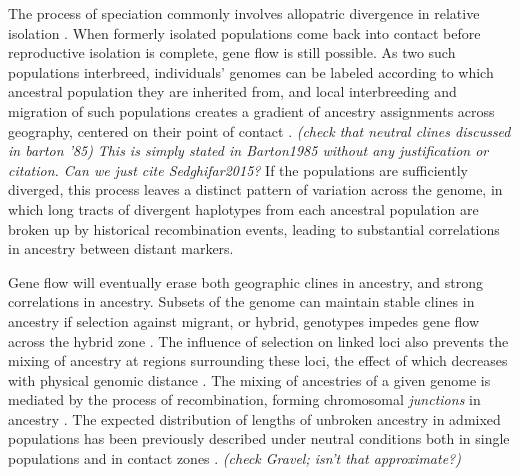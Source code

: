\documentclass[11pt,letterpaper]{article}
\newcommand{\alisa}[1]{{\em \color{red} #1}}
\newcommand{\plr}[1]{{\em \color{blue} #1}}
\begin{document}

The process of speciation commonly involves allopatric divergence in relative isolation \citep{Coyne2004}.  
When formerly isolated populations come back into contact 
before reproductive isolation is complete, gene flow is still possible. 
As two such populations interbreed,
individuals' genomes can be labeled according to which ancestral population they are inherited from,
and local interbreeding and migration of such populations
creates a gradient of ancestry assignments across geography,
centered on their point of contact \citep{Barton1985}. 
\plr{(check that neutral clines discussed in barton '85)}\alisa{This is simply stated in Barton1985 without any justification or citation. Can we just cite Sedghifar2015?}
If the populations are sufficiently diverged,
this process leaves a distinct pattern of variation across the genome, 
in which long tracts of divergent haplotypes from each ancestral population  
are broken up by historical recombination events,
leading to substantial correlations in ancestry between distant markers.


Gene flow will eventually erase 
both geographic clines in ancestry, and strong correlations in ancestry.
Subsets of the genome can maintain stable clines in ancestry if selection against migrant, or hybrid, genotypes impedes gene flow across the hybrid zone \citep{Barton1979a}. The influence of selection on linked loci also prevents the mixing of ancestry at regions surrounding these loci, the effect of which decreases with physical genomic distance \citep{Barton1986,Barton1983}. 
The mixing of ancestries of a given genome is mediated by 
the process of recombination, forming chromosomal \emph{junctions} in ancestry \citep{Fisher1954, Chapman2002, Baird2003}.   
The expected distribution of lengths of unbroken ancestry in admixed populations has been previously described under neutral conditions both in single populations and in contact zones \citep[e.g.][]{Gravel2012,Sedghifar2015}.  
\plr{(check Gravel; isn't that approximate?)}
\end{document}
